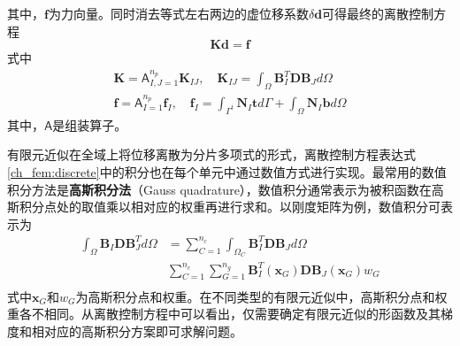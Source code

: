 其中，$\boldsymbol f$为力向量。同时消去等式左右两边的虚位移系数$\delta \boldsymbol d$可得最终的离散控制方程
\begin{equation}
\boldsymbol K \boldsymbol d = \boldsymbol f
\end{equation}
式中
\begin{subequations}\label{ch_fem:discrete}
\begin{align}
        \boldsymbol K = \mathsf{A}_{I,J=1}^{n_p} \boldsymbol K_{IJ}, \quad \boldsymbol K_{IJ} = \int_{\Omega}\boldsymbol B_I^T \boldsymbol D \boldsymbol B_J d\Omega \label{ch_fem:stiffness} \\
        \boldsymbol f = \mathsf{A}_{I=1}^{n_p} \boldsymbol f_{I}, \quad \boldsymbol f_I = \int_{\Gamma^t}\boldsymbol N_I \boldsymbol t d\Gamma + \int_{\Omega}\boldsymbol N_I \boldsymbol b d\Omega \label{ch_fem:force}
\end{align}
\end{subequations}
其中，$\mathsf{A}$是组装算子。\par
有限元近似在全域上将位移离散为分片多项式的形式，离散控制方程表达式\eqref{ch_fem:discrete}中的积分也在每个单元中通过数值方式进行实现。最常用的数值积分方法是\textbf{高斯积分法}（Gauss quadrature），数值积分通常表示为被积函数在高斯积分点处的取值乘以相对应的权重再进行求和。以刚度矩阵为例，数值积分可表示为
\begin{equation}
\begin{split}
\int_{\Omega}\boldsymbol B_I \boldsymbol D \boldsymbol B_J^T d\Omega &=
\sum_{C=1}^{n_c} \int_{\Omega_C}\boldsymbol B_I^T \boldsymbol D \boldsymbol B_J d\Omega \\
&\sum_{C=1}^{n_c}\sum_{G=1}^{n_g} \boldsymbol B_I^T(\boldsymbol x_G) \boldsymbol D \boldsymbol B_J(\boldsymbol x_G)w_G \\
\end{split}
\end{equation}
式中$\boldsymbol x_G$和$w_G$为高斯积分点和权重。在不同类型的有限元近似中，高斯积分点和权重各不相同。从离散控制方程中可以看出，仅需要确定有限元近似的形函数及其梯度和相对应的高斯积分方案即可求解问题。

